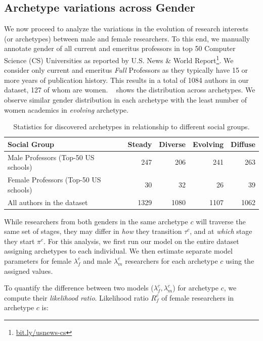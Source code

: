 \subsection{Archetype variations across Gender}
\label{sec:discussion}
We now proceed to analyze the variations in the evolution of research interests (or archetypes) between male and female researchers. To this end, we manually annotate gender of all current and emeritus professors in top 50 Computer Science (CS) Universities as reported by U.S. News \& World Report\footnote{\url{bit.ly/usnews-cs}}. We consider only current and emeritus \emph{Full} Professors as they typically have 15 or more years of publication history. This results in a total of 1084 authors in our dataset, 127 of whom are women. ~ shows the distribution across archetypes. We observe similar gender distribution in each archetype with the least number of women academics in \emph{evolving} archetype.

\begin{table}[h]
    \centering
    \begin{tabular}{l r r r r}
        \toprule
             Social Group   & Steady  & Diverse & Evolving & Diffuse \\ \midrule
        Male    Professors (Top-50 US schools) & 247     & 206     & 241    & 263   \\
        Female Professors (Top-50 US schools) & 30     & 32    & 26    & 39  \\
        All authors in the dataset   & 1329    & 1080     & 1107    & 1062   \\ \bottomrule %
    \end{tabular}
    \caption{ \label{tab:acadclusterdata} Statistics for discovered archetypes in relationship to different social groups.}
\end{table}


While researchers from both genders in the same archetype $c$ will traverse the same set of stages, they may differ in \textit{how} they transition $\tau^c$, and at \textit{which} stage they start $\pi^c$. For this analysis, we first run our model on the entire dataset assigning archetypes to each individual. We then estimate separate model parameters for female $\lambda^c_f$ and male $\lambda^c_m$ researchers for each archetype $c$ using the assigned values.

To quantify the difference between two models ($\lambda^c_f, \lambda^c_m$) for archetype $c$, we compute their \emph{likelihood ratio}. Likelihood ratio $R^c_f$ of female researchers in archetype $c$ is:

